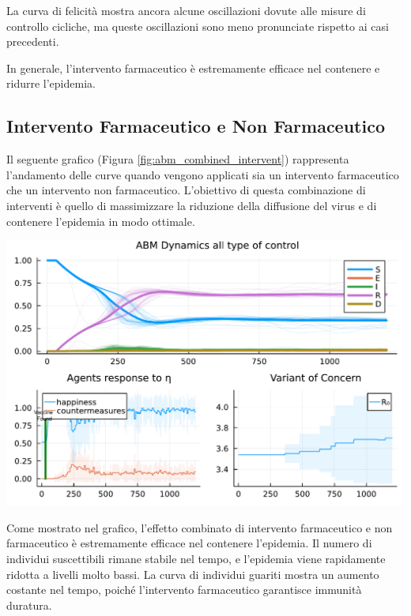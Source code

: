 La curva di felicità mostra ancora alcune oscillazioni dovute alle 
misure di controllo cicliche, ma queste oscillazioni sono meno 
pronunciate rispetto ai casi precedenti.

In generale, l'intervento farmaceutico è estremamente efficace nel 
contenere e ridurre l'epidemia.

\subsection{Intervento Farmaceutico e Non Farmaceutico}

Il seguente grafico (Figura \ref{fig:abm_combined_intervent}) 
rappresenta l'andamento delle curve quando vengono applicati sia 
un intervento farmaceutico che un intervento non farmaceutico. 
L'obiettivo di questa combinazione di interventi è quello di 
massimizzare la riduzione della diffusione del virus e di contenere 
l'epidemia in modo ottimale.

\begin{minipage}{\linewidth}
    \centering
    \includegraphics[width=\textwidth]{img/SocialNetworkABM_ALL.pdf}
    \label{fig:abm_combined_intervent}
\end{minipage}

Come mostrato nel grafico, l'effetto combinato di intervento 
farmaceutico e non farmaceutico è estremamente efficace nel 
contenere l'epidemia. Il numero di individui suscettibili 
rimane stabile nel tempo, e l'epidemia viene rapidamente ridotta 
a livelli molto bassi. La curva di individui guariti mostra un 
aumento costante nel tempo, poiché l'intervento farmaceutico 
garantisce immunità duratura.

